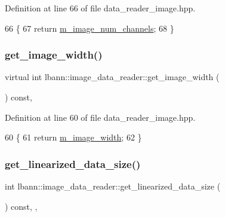 Definition at line 66 of file data\+\_\+reader\+\_\+image.\+hpp.


\begin{DoxyCode}
66                                              \{
67     \textcolor{keywordflow}{return} \hyperlink{classlbann_1_1image__data__reader_aab1a440f361521dc7bd583cefe1061f8}{m\_image\_num\_channels};
68   \}
\end{DoxyCode}
\mbox{\label{classlbann_1_1image__data__reader_a2e75d4ec8f222f4f855e6c0162648dc7}} 
\subsubsection{\texorpdfstring{get\+\_\+image\+\_\+width()}{get\_image\_width()}}
{\footnotesize\ttfamily virtual int lbann\+::image\+\_\+data\+\_\+reader\+::get\+\_\+image\+\_\+width (\begin{DoxyParamCaption}{ }\end{DoxyParamCaption}) const\hspace{0.3cm}{\ttfamily [inline]}, {\ttfamily [virtual]}}



Definition at line 60 of file data\+\_\+reader\+\_\+image.\+hpp.


\begin{DoxyCode}
60                                       \{
61     \textcolor{keywordflow}{return} \hyperlink{classlbann_1_1image__data__reader_af001f3d1c0f1c580b66988233b3a64f0}{m\_image\_width};
62   \}
\end{DoxyCode}
\mbox{\label{classlbann_1_1image__data__reader_a26b8566e76ba99c017a84c49a9dec37c}} 
\subsubsection{\texorpdfstring{get\+\_\+linearized\+\_\+data\+\_\+size()}{get\_linearized\_data\_size()}}
{\footnotesize\ttfamily int lbann\+::image\+\_\+data\+\_\+reader\+::get\+\_\+linearized\+\_\+data\+\_\+size (\begin{DoxyParamCaption}{ }\end{DoxyParamCaption}) const\hspace{0.3cm}{\ttfamily [inline]}, {\ttfamily [override]}, {\ttfamily [virtual]}}



